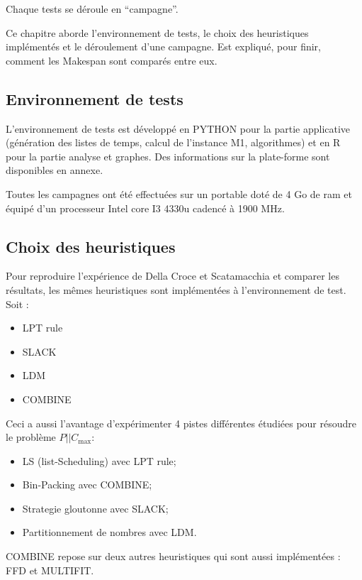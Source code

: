 \documentclass[a4paper,12pt]{report}
\theoremstyle{plain}				%
\theoremstyle{definition}				%
\newcommand\problemGrahamP{$P||C_{\max}$\xspace}
\newcommand\dcs{Della Croce et Scatamacchia\xspace}
\begin{document}
Chaque tests se déroule en ``campagne''. 

Ce chapitre aborde l’environnement de tests, le choix des heuristiques implémentés et le déroulement d'une campagne. Est expliqué, pour finir, comment les Makespan sont comparés entre eux.

\subsection{Environnement de tests} \label{ssec:campagnesEnvironnementDeTests}

L'environnement de tests est développé 
  en PYTHON pour la partie applicative 
  (génération des listes de temps, calcul de l'instance M1, algorithmes) et 
  en R pour la partie analyse et graphes. 
Des informations sur la plate-forme sont disponibles en annexe.

Toutes les campagnes ont été effectuées sur un portable 
  doté de 4 Go de ram et 
  équipé d'un processeur Intel core I3 4330u cadencé à 1900 MHz.


\subsection{Choix des heuristiques} \label{campagneChoisHeuristiques}

Pour reproduire l'expérience de \dcs et comparer les résultats, les mêmes heuristiques sont implémentées à l'environnement de test. Soit :
\begin{itemize}
	\item LPT rule
	\item SLACK
	\item LDM
	\item COMBINE
\end{itemize}

Ceci a aussi l'avantage d'expérimenter 4 pistes différentes étudiées 
  pour résoudre le problème \problemGrahamP :
\begin{itemize}
	\item LS (list-Scheduling) avec LPT rule; 
	\item Bin-Packing avec COMBINE; 
	\item Strategie gloutonne avec SLACK; 
	\item Partitionnement de nombres avec LDM.  
\end{itemize}

COMBINE repose sur deux autres heuristiques qui sont aussi implémentées : FFD et MULTIFIT.
\end{document}
